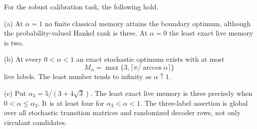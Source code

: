 \begin{theorem}\label{thm:qubit-positive-phase}
For the robust calibration task, the following hold.

\textup{(a)} At $\alpha=1$ no finite classical memory attains the boundary optimum, although the probability-valued Hankel rank is three. At $\alpha=0$ the least exact live memory is two.

\textup{(b)} At every $0<\alpha<1$ an exact stochastic optimum exists with at most
\[
 M_\alpha=\max\{3,\lceil\pi/\arccos\alpha\rceil\}
\]
live labels. The least number tends to infinity as $\alpha\uparrow1$.

\textup{(c)} Put $\alpha_3=5/(3+4\sqrt3)$. The least exact live memory is three precisely when $0<\alpha\le\alpha_3$. It is at least four for $\alpha_3<\alpha<1$. The three-label assertion is global over all stochastic transition matrices and randomized decoder rows, not only circulant candidates.
\end{theorem}
